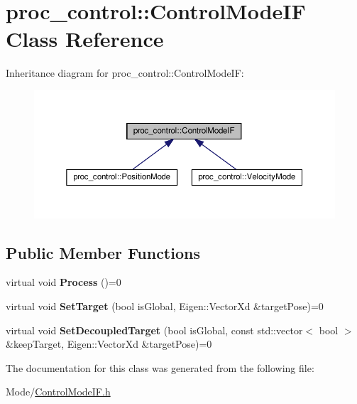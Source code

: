 \hypertarget{classproc__control_1_1_control_mode_i_f}{}\section{proc\+\_\+control\+:\+:Control\+Mode\+IF Class Reference}
\label{classproc__control_1_1_control_mode_i_f}


Inheritance diagram for proc\+\_\+control\+:\+:Control\+Mode\+IF\+:\nopagebreak
\begin{figure}[H]
\begin{center}
\leavevmode
\includegraphics[width=350pt]{classproc__control_1_1_control_mode_i_f__inherit__graph}
\end{center}
\end{figure}
\subsection*{Public Member Functions}
\begin{DoxyCompactItemize}
\item 
\mbox{\label{classproc__control_1_1_control_mode_i_f_a7a42e32ea4bb6857ffbd9218b8941e8f}} 
virtual void {\bfseries Process} ()=0
\item 
\mbox{\label{classproc__control_1_1_control_mode_i_f_a262e9386519da6be5915e9bf876adfce}} 
virtual void {\bfseries Set\+Target} (bool is\+Global, Eigen\+::\+Vector\+Xd \&target\+Pose)=0
\item 
\mbox{\label{classproc__control_1_1_control_mode_i_f_aef8533875572c59470de62e79b258672}} 
virtual void {\bfseries Set\+Decoupled\+Target} (bool is\+Global, const std\+::vector$<$ bool $>$ \&keep\+Target, Eigen\+::\+Vector\+Xd \&target\+Pose)=0
\end{DoxyCompactItemize}


The documentation for this class was generated from the following file\+:\begin{DoxyCompactItemize}
\item 
Mode/\hyperlink{_control_mode_i_f_8h}{Control\+Mode\+I\+F.\+h}\end{DoxyCompactItemize}
